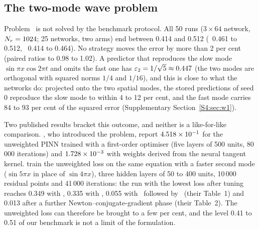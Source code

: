 \subsection{The two-mode wave problem}
\label{s5_hard:sec:w1}

Problem \PWone\ is not solved by the benchmark protocol. All 50 runs ($3\times 64$
network, $N_{r}=1024$; 25 networks, two arms) end between 0.414 and 0.512 (\Adam\ 0.461 to
0.512, \AdamLBFGS\ 0.414 to 0.464). No strategy moves the error by more than 2 per cent
(paired ratios to  0.98 to 1.02).
A predictor that reproduces the slow mode $\sin\pi x\cos 2\pi t$ and omits the fast one has
$\varepsilon_{2}=1/\sqrt5\approx 0.447$ (the two modes are orthogonal with squared norms $1/4$ and
$1/16$), and this is close to what the networks do: projected onto the two spatial modes,
the stored predictions of seed 0 reproduce the slow mode to within 4 to 12 per cent, and the
fast mode carries 84 to 93 per cent of the squared error (Supplementary
Section~\ref{S4:sec:w1}).

Two published results bracket this outcome, and neither is a like-for-like comparison.
\citet{wangyu2022}, who introduced the problem, report $4.518\times 10^{-1}$ for the
unweighted PINN trained with a first-order optimiser (five layers of 500 units, 80\,000
iterations) and $1.728\times 10^{-3}$ with weights derived from the neural tangent kernel.
\citet{rathore2024} train the unweighted loss on the same equation with a faster second
mode ($\sin5\pi x$ in place of $\sin4\pi x$), three hidden layers of 50 to 400 units,
10\,000 residual points and 41\,000 iterations: the run with the lowest loss after tuning reaches 0.349 with
\Adam, 0.335 with \LBFGS, 0.055 with \Adam\ followed by \LBFGS\ (their Table~1) and 0.013
after a further Newton--conjugate-gradient phase (their Table~2). The unweighted loss can
therefore be brought to a few per cent, and the level 0.41 to 0.51 of our benchmark is
not a limit of the formulation.

